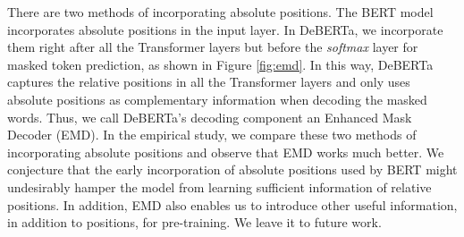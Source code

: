 There are two methods of incorporating absolute positions. The BERT model incorporates absolute positions in the input layer. 
In DeBERTa, we %
incorporate them right after all the Transformer layers but before the \emph{softmax} layer for masked token prediction, as shown in Figure \ref{fig:emd}. 
In this way, DeBERTa captures the relative positions in all the Transformer layers and only uses absolute positions as complementary information when decoding the masked words. %
Thus, we call DeBERTa's decoding component an Enhanced Mask Decoder (EMD). 
In the empirical study, we compare these two methods of incorporating absolute positions and observe that EMD works much better. 
We conjecture that the early incorporation of absolute positions used by BERT might undesirably hamper the model from learning sufficient information of relative positions. In addition, EMD also enables us to introduce other useful information, in addition to positions, for pre-training. We leave it to future work.





